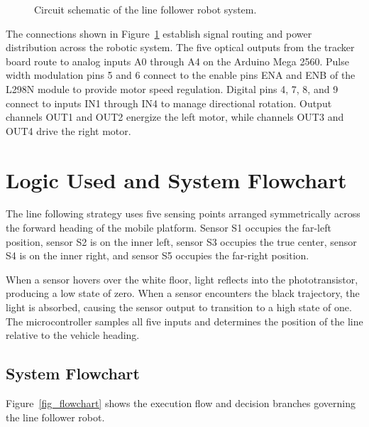 \documentclass[11pt,a4paper]{article}
\begin{document}
\begin{figure}[H]
\caption{Circuit schematic of the line follower robot system.}
\label{fig_wiring}
\end{figure}

The connections shown in Figure~\ref{fig_wiring} establish signal routing and power distribution across the robotic system. The five optical outputs from the tracker board route to analog inputs A0 through A4 on the Arduino Mega 2560. Pulse width modulation pins 5 and 6 connect to the enable pins ENA and ENB of the L298N module to provide motor speed regulation. Digital pins 4, 7, 8, and 9 connect to inputs IN1 through IN4 to manage directional rotation. Output channels OUT1 and OUT2 energize the left motor, while channels OUT3 and OUT4 drive the right motor.

\section{Logic Used and System Flowchart}
The line following strategy uses five sensing points arranged symmetrically across the forward heading of the mobile platform. Sensor S1 occupies the far-left position, sensor S2 is on the inner left, sensor S3 occupies the true center, sensor S4 is on the inner right, and sensor S5 occupies the far-right position.

When a sensor hovers over the white floor, light reflects into the phototransistor, producing a low state of zero. When a sensor encounters the black trajectory, the light is absorbed, causing the sensor output to transition to a high state of one. The microcontroller samples all five inputs and determines the position of the line relative to the vehicle heading.

\subsection{System Flowchart}
Figure~\ref{fig_flowchart} shows the execution flow and decision branches governing the line follower robot.
\end{document}
